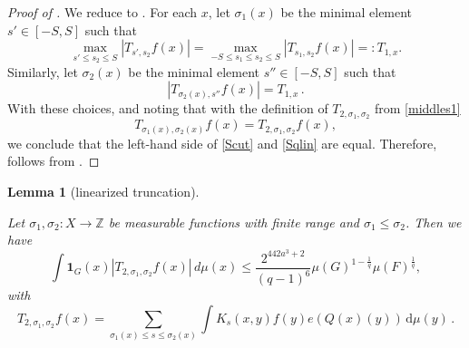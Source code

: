 \documentclass[10pt,a4paper]{article}
\theoremstyle{plain}
\newtheorem{lemma}[theorem]{Lemma}
\theoremstyle{definition}
\numberwithin{equation}{subsection}
\newcommand{\tQ}{{Q}}
\newcommand{\lean}[1]{}
\newcommand{\uses}[1]{}
\newcommand{\leanok}{}
\begin{document}
\begin{proof}[Proof of ]
    \leanok
    We reduce  to . For each $x$, let $\sigma_1(x)$ be the
    minimal element $s'\in [-S,S]$ such that
    \[
    \max_{s'\le s_2\le S} |T_{s',s_2} f(x)| = \max_{-S\le s_1\le s_2\le S} |T_{s_1,s_2} f(x)| =: T_{1,x}.
    \]
    Similarly, let ${\sigma}_2(x)$ be the minimal element $s''\in [-S,S]$ such that
    \[
    |T_{\sigma_2(x), s''} f(x)| = T_{1,x}\,.
    \]
    With these choices, and noting that with the definition of $T_{2, \sigma_1, \sigma_2}$ from \eqref{middles1}
    \begin{equation*}
    T_{\sigma_1(x),\sigma_2(x)} f(x)=T_{2,\sigma_1,\sigma_2} f(x),
    \end{equation*}
    we conclude that the left-hand side of \eqref{Scut} and \eqref{Sqlin} are equal.
    Therefore,  follows from .
\end{proof}

\begin{lemma}[linearized truncation]
    \label{linearized-truncation}
    \leanok
    \lean{linearized_truncation}
    \uses{finitary-Carleson}
    Let $\sigma_1,\sigma_2\colon X\to \mathbb{Z}$ be measurable functions with finite range and $\sigma_1\leq \sigma_2$.
    Then we have
    \begin{equation} \label{Sqlin}
        \int \mathbf{1}_{G}(x)
        \left| {T}_{2,\sigma_1,\sigma_2}f(x)\right|\, d\mu(x)
        \le \frac{2^{442a^3+2}}{(q-1)^6} \mu(G)^{1-\frac{1}{q}} \mu(F)^{\frac{1}{q}},
    \end{equation}
    with
    \begin{equation}\label{middles1}
        {T}_{2,\sigma_1,\sigma_2}f(x)=\sum_{\sigma_1(x) \le s\le \sigma_2(x)}
        \int K_s(x,y) f(y) e(\tQ(x)(y)) \, \mathrm{d}\mu(y)\,.
    \end{equation}
\end{lemma}
\end{document}
